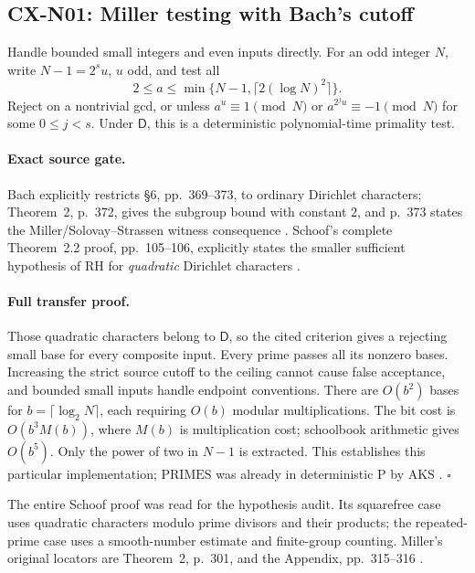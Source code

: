 \documentclass[11pt,a4paper]{article}
\begin{document}
\subsection{CX-N01: Miller testing with Bach's cutoff}
\label{cx-n01}

Handle bounded small integers and even inputs directly. For an odd
integer \(N\), write \(N-1=2^s u\), \(u\) odd, and test all
\[
 2\leq a\leq\min\{N-1,\lceil2(\log N)^2\rceil\}.
\]
Reject on a nontrivial gcd, or unless \(a^u\equiv1\pmod N\) or
\(a^{2^ju}\equiv-1\pmod N\) for some \(0\leq j<s\).
Under \(\mathsf D\), this is a deterministic polynomial-time primality test.

\paragraph{Exact source gate.}
Bach explicitly restricts \S6, pp.~369--373, to ordinary Dirichlet
characters; Theorem~2, p.~372, gives the subgroup bound with constant \(2\),
and p.~373 states the Miller/Solovay--Strassen witness consequence
\cite{CXNBach90}. Schoof's complete Theorem~2.2 proof, pp.~105--106,
explicitly states the smaller sufficient hypothesis of RH for
\emph{quadratic} Dirichlet characters \cite{CXNSchoof08}.

\paragraph{Full transfer proof.}
Those quadratic characters belong to \(\mathsf D\), so the cited criterion
gives a rejecting small base for every composite input. Every prime passes
all its nonzero bases. Increasing the strict source cutoff to the ceiling
cannot cause false acceptance, and bounded small inputs handle endpoint
conventions. There are \(O(b^2)\) bases for \(b=\lceil\log_2N\rceil\), each
requiring \(O(b)\) modular multiplications. The bit cost is
\(O(b^3M(b))\), where \(M(b)\) is multiplication cost; schoolbook arithmetic
gives \(O(b^5)\). Only the power of two in \(N-1\) is extracted.
This establishes this particular implementation; \(\mathrm{PRIMES}\)
was already in deterministic \(\mathrm P\) by AKS \cite[Theorem~4.1 p.~785 and Theorem~5.1 p.~789]{CXNAKS04}. \(\square\)

The entire Schoof proof was read for the hypothesis audit. Its squarefree
case uses quadratic characters modulo prime divisors and their products;
the repeated-prime case uses a smooth-number estimate and finite-group
counting. Miller's original locators are Theorem~2, p.~301, and the
Appendix, pp.~315--316 \cite{CXNMiller76}.
\end{document}
